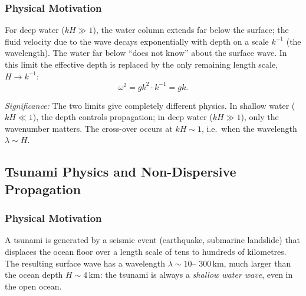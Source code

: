 \subsubsection*{Physical Motivation}
For deep water ($kH\gg1$), the water column extends far below the surface; the
fluid velocity due to the wave decays exponentially with depth on a scale
$k^{-1}$ (the wavelength). The water far below ``does not know'' about the
surface wave. In this limit the effective depth is replaced by the only
remaining length scale, $H\to k^{-1}$:
\begin{equation}
    \omega^2 = gk^2\cdot k^{-1} = gk.
    \label{eq:lec10:dw-derivation}
\end{equation}


\textit{Significance:} The two limits give completely different physics. In
shallow water ($kH\ll1$), the depth controls propagation; in deep water
($kH\gg1$), only the wavenumber matters. The cross-over occurs at $kH\sim1$,
i.e.\ when the wavelength $\lambda\sim H$.


\subsection{Tsunami Physics and Non-Dispersive Propagation}
\label{sec:lec10:tsunami}

\subsubsection*{Physical Motivation}
A tsunami is generated by a seismic event (earthquake, submarine landslide)
that displaces the ocean floor over a length scale of tens to hundreds of
kilometres. The resulting surface wave has a wavelength $\lambda \sim 10$--
$300\,\text{km}$, much larger than the ocean depth $H\sim4\,\text{km}$: the
tsunami is always a \emph{shallow water wave}, even in the open ocean.

